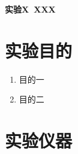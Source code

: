 


\begin{center}
	{ \bfseries 实验X\ XXX}
\end{center}


\section{实验目的}
\begin{H1}
\begin{enumerate}
	\item 目的一
	\item 目的二
\end{enumerate}
\end{H1}

\section{实验仪器}

